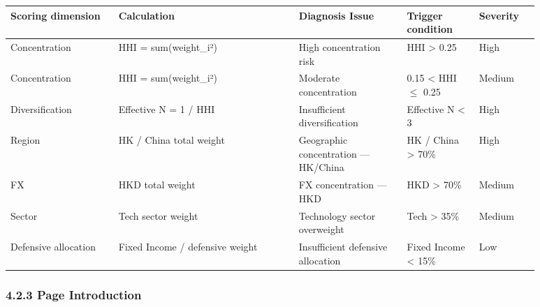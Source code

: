 \begingroup
\small
\begin{longtable}{L{0.18\linewidth}L{0.30\linewidth}L{0.18\linewidth}L{0.12\linewidth}L{0.10\linewidth}}
\toprule
\textbf{Scoring dimension} & \textbf{Calculation} & \textbf{Diagnosis Issue} & \textbf{Trigger condition} & \textbf{Severity} \\
\midrule
Concentration & HHI = sum(weight\_i²) & High concentration risk & HHI \textgreater{} 0.25 & High \\
Concentration & HHI = sum(weight\_i²) & Moderate concentration & 0.15 \textless{} HHI \ensuremath{\le} 0.25 & Medium \\
Diversification & Effective N = 1 / HHI & Insufficient diversification & Effective N \textless{} 3 & High \\
Region & HK / China total weight & Geographic concentration — HK/China & HK / China \textgreater{} 70\% & High \\
FX & HKD total weight & FX concentration — HKD & HKD \textgreater{} 70\% & Medium \\
Sector & Tech sector weight & Technology sector overweight & Tech \textgreater{} 35\% & Medium \\
Defensive allocation & Fixed Income / defensive weight & Insufficient defensive allocation & Fixed Income \textless{} 15\% & Low \\
\bottomrule
\end{longtable}
\endgroup

\subsubsection{4.2.3 Page Introduction}





